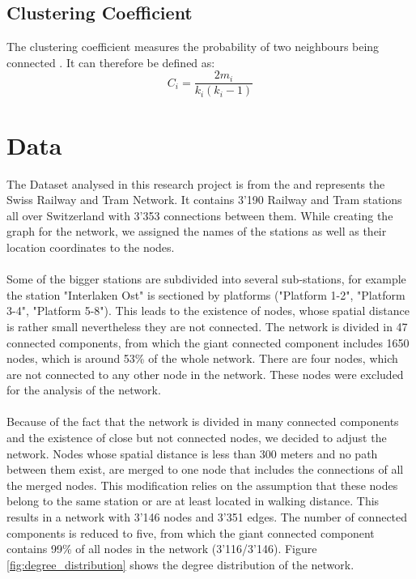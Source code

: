 \documentclass{Resources/netsci-project}
\begin{document}
\subsection{Clustering Coefficient}
The clustering coefficient measures the probability of two neighbours being connected \autocite{ComplexTopology}. It can therefore be defined as:
\begin{equation} \label{eqRestMass}
C_{i} =\dfrac{2m_i}{k_i(k_i -1)}
\end{equation}

\section{Data}
The Dataset analysed in this research project is from the \textcite{Dataset} and represents the Swiss Railway and Tram Network. It contains 3’190 Railway and Tram stations all over Switzerland with 3'353 connections between them. While creating the graph for the network, we assigned the names of the stations as well as their location coordinates to the nodes.
\\~\\
Some of the bigger stations are subdivided into several sub-stations, for example the station "Interlaken Ost" is sectioned by platforms ("Platform 1-2", "Platform 3-4", "Platform 5-8"). This leads to the existence of nodes, whose spatial distance is rather small nevertheless they are not connected. The network is divided in 47 connected components, from which the giant connected component includes 1650 nodes, which is around 53\% of the whole network. There are four nodes, which are not connected to any other node in the network. These nodes were excluded for the analysis of the network.
\\~\\
Because of the fact that the network is divided in many connected components and the existence of close but not connected nodes, we decided to adjust the network. Nodes whose spatial distance is less than 300 meters and no path between them exist, are merged to one node that includes the connections of all the merged nodes. This modification relies on the assumption that these nodes belong to the same station or are at least located in walking distance. This results in a network with 3'146 nodes and 3'351 edges. The number of connected components is reduced to five, from which the giant connected component contains 99\% of all nodes in the network (3’116/3’146). Figure \ref{fig:degree_distribution} shows the degree distribution of the network.
\end{document}
